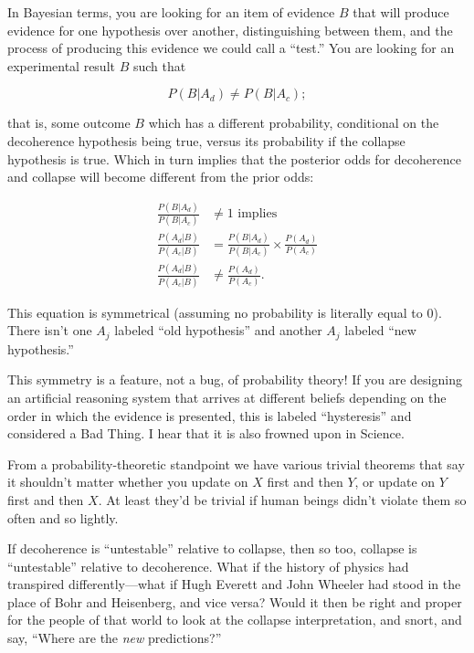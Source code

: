 {
 In Bayesian terms, you are looking for an item of evidence $B$ that
will produce evidence for one hypothesis over another, distinguishing
between them, and the process of producing this evidence we could call
a ``test.'' You are looking for an
experimental result $B$ such that}

\begin{equation*}
 P(B|A_{d}) \neq P(B|A_{c});
\end{equation*}


{
 that is, some outcome $B$ which has a different probability,
conditional on the decoherence hypothesis being true, versus its
probability if the collapse hypothesis is true. Which in turn implies
that the posterior odds for decoherence and collapse will become
different from the prior odds:}

\begin{align*}
  \frac{P(B|A_d)}{P(B|A_c)} &\neq 1 \text{ implies} \\
  \frac{P(A_d|B)}{P(A_c|B)} &= \frac{P(B|A_d)}{P(B|A_c)} \times \frac{P(A_d)}{P(A_c)} \\
  \frac{P(A_d|B)}{P(A_c|B)} &\neq \frac{P(A_d)}{P(A_c)} .
\end{align*}


\bigskip

{
 This equation is symmetrical (assuming no probability is literally
equal to 0). There isn't one $A_{j}$ labeled
``old hypothesis'' and another
$A_{j}$ labeled ``new
hypothesis.''}

{
 This symmetry is a feature, not a bug, of probability theory! If
you are designing an artificial reasoning system that arrives at
different beliefs depending on the order in which the evidence is
presented, this is labeled
``hysteresis'' and considered a Bad
Thing. I hear that it is also frowned upon in Science.}

{
 From a probability-theoretic standpoint we have various trivial
theorems that say it shouldn't matter whether you
update on $X$ first and then $Y$, or update on $Y$ first and then $X$. At least
they'd be trivial if human beings
didn't violate them so often and so lightly.}

{
 If decoherence is
``untestable'' relative to collapse,
then so too, collapse is
``untestable'' relative to
decoherence. What if the history of physics had transpired
differently---what if Hugh Everett and John Wheeler had stood in the
place of Bohr and Heisenberg, and vice versa? Would it then be right
and proper for the people of that world to look at the collapse
interpretation, and snort, and say, ``Where are the
\textit{new} predictions?''}

